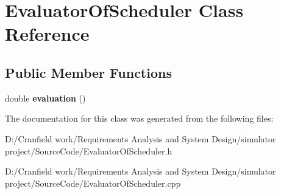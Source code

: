 \hypertarget{class_evaluator_of_scheduler}{}\section{Evaluator\+Of\+Scheduler Class Reference}
\label{class_evaluator_of_scheduler}
\subsection*{Public Member Functions}
\begin{DoxyCompactItemize}
\item 
\mbox{\label{class_evaluator_of_scheduler_a0a1a38f0808b9cbc60af59cb1468f866}} 
double {\bfseries evaluation} ()
\end{DoxyCompactItemize}


The documentation for this class was generated from the following files\+:\begin{DoxyCompactItemize}
\item 
D\+:/\+Cranfield work/\+Requirements Analysis and System Design/simulator project/\+Source\+Code/Evaluator\+Of\+Scheduler.\+h\item 
D\+:/\+Cranfield work/\+Requirements Analysis and System Design/simulator project/\+Source\+Code/Evaluator\+Of\+Scheduler.\+cpp\end{DoxyCompactItemize}
